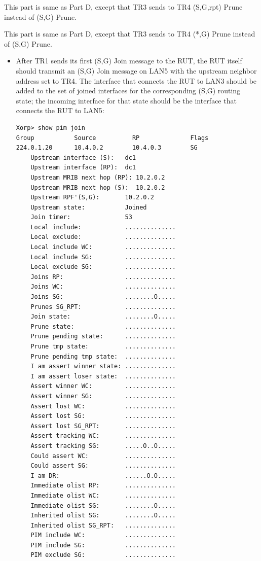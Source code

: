 \documentclass[11pt]{report}
\begin{document}

This part is same as Part D, except that TR3 sends to TR4 (S,G,rpt) Prune
instead of (S,G) Prune.


This part is same as Part D, except that TR3 sends to TR4 (*,G) Prune
instead of (S,G) Prune.



\begin{itemize}

  \item After TR1 sends its first (S,G) Join message to the RUT, the RUT
  itself should transmit an (S,G) Join message on LAN5 with the upstream
  neighbor address set to TR4. The interface that connects the RUT to LAN3
  should be added to the set of joined interfaces for the corresponding
  (S,G) routing state; the incoming interface for that state should be the
  interface that connects the RUT to LAN5:

\begin{verbatim}
Xorp> show pim join 
Group           Source          RP              Flags
224.0.1.20      10.4.0.2        10.4.0.3        SG   
    Upstream interface (S):   dc1
    Upstream interface (RP):  dc1
    Upstream MRIB next hop (RP): 10.2.0.2
    Upstream MRIB next hop (S):  10.2.0.2
    Upstream RPF'(S,G):       10.2.0.2
    Upstream state:           Joined 
    Join timer:               53
    Local include:            ..............
    Local exclude:            ..............
    Local include WC:         ..............
    Local include SG:         ..............
    Local exclude SG:         ..............
    Joins RP:                 ..............
    Joins WC:                 ..............
    Joins SG:                 ........O.....
    Prunes SG_RPT:            ..............
    Join state:               ........O.....
    Prune state:              ..............
    Prune pending state:      ..............
    Prune tmp state:          ..............
    Prune pending tmp state:  ..............
    I am assert winner state: ..............
    I am assert loser state:  ..............
    Assert winner WC:         ..............
    Assert winner SG:         ..............
    Assert lost WC:           ..............
    Assert lost SG:           ..............
    Assert lost SG_RPT:       ..............
    Assert tracking WC:       ..............
    Assert tracking SG:       .....O..O.....
    Could assert WC:          ..............
    Could assert SG:          ..............
    I am DR:                  ......O.O.....
    Immediate olist RP:       ..............
    Immediate olist WC:       ..............
    Immediate olist SG:       ........O.....
    Inherited olist SG:       ........O.....
    Inherited olist SG_RPT:   ..............
    PIM include WC:           ..............
    PIM include SG:           ..............
    PIM exclude SG:           ..............
\end{verbatim}


\end{itemize}
\end{document}
